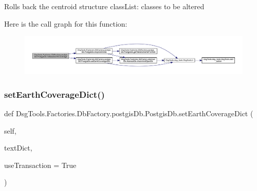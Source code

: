 \begin{DoxyVerb}Rolls back the centroid structure
classList: classes to be altered
\end{DoxyVerb}
 Here is the call graph for this function\+:
\nopagebreak
\begin{figure}[H]
\begin{center}
\leavevmode
\includegraphics[width=350pt]{class_dsg_tools_1_1_factories_1_1_db_factory_1_1postgis_db_1_1_postgis_db_a6f43ff84be219d8dc9061838aeb436d2_cgraph}
\end{center}
\end{figure}
\mbox{\label{class_dsg_tools_1_1_factories_1_1_db_factory_1_1postgis_db_1_1_postgis_db_a29caf37621c8c30add3322f044fe702f}} 
\subsubsection{\texorpdfstring{set\+Earth\+Coverage\+Dict()}{setEarthCoverageDict()}}
{\footnotesize\ttfamily def Dsg\+Tools.\+Factories.\+Db\+Factory.\+postgis\+Db.\+Postgis\+Db.\+set\+Earth\+Coverage\+Dict (\begin{DoxyParamCaption}\item[{}]{self,  }\item[{}]{text\+Dict,  }\item[{}]{use\+Transaction = {\ttfamily True} }\end{DoxyParamCaption})}

